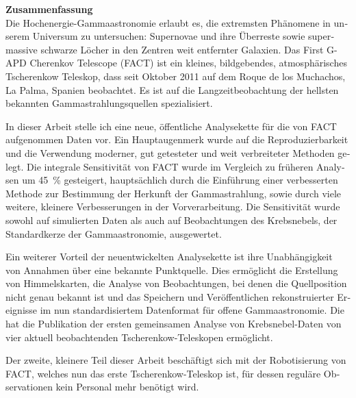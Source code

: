 \bigskip
\begin{otherlanguage}{ngerman}
\noindent\textbf{\sffamily\Large Zusammenfassung}\\[0.5\baselineskip]
Die Hochenergie-Gammaastronomie erlaubt es, die extremsten Phänomene in unserem Universum
zu untersuchen: Supernovae und ihre Überreste sowie supermassive schwarze Löcher in den
Zentren weit entfernter Galaxien.
  Das First G-APD Cherenkov Telescope (FACT) ist ein kleines, bildgebendes, atmosphärisches Tscherenkow Teleskop, dass seit Oktober 2011 auf dem Roque de los Muchachos, La Palma, Spanien beobachtet.
Es ist auf die Langzeitbeobachtung der hellsten bekannten Gammastrahlungsquellen spezialisiert.

In dieser Arbeit stelle ich eine neue, öffentliche Analysekette für die von FACT aufgenommen
Daten vor.
Ein Hauptaugenmerk wurde auf die Reproduzierbarkeit und die Verwendung moderner,
gut getesteter und weit verbreiteter Methoden gelegt.
Die integrale Sensitivität von FACT wurde im Vergleich zu früheren Analysen um \SI{45}{\percent}
gesteigert, hauptsächlich durch die Einführung einer verbesserten Methode zur Bestimmung der
Herkunft der Gammastrahlung, sowie durch viele weitere, kleinere Verbesserungen in der Vorverarbeitung.
Die Sensitivität wurde sowohl auf simulierten Daten als auch auf Beobachtungen des Krebsnebels,
der Standardkerze der Gammaastronomie, ausgewertet.

Ein weiterer Vorteil der neuentwickelten Analysekette ist ihre Unabhängigkeit von
Annahmen über eine bekannte Punktquelle.
Dies ermöglicht die Erstellung von Himmelskarten, die Analyse von Beobachtungen,
bei denen die Quellposition nicht genau bekannt ist und das Speichern und Veröffentlichen
rekonstruierter Ereignisse im nun standardisiertem Datenformat für offene Gammaastronomie.
Die hat die Publikation der ersten gemeinsamen Analyse von Krebsnebel-Daten von vier 
aktuell beobachtenden Tscherenkow-Teleskopen ermöglicht.

Der zweite, kleinere Teil dieser Arbeit beschäftigt sich mit der Robotisierung von FACT,
welches nun das erste Tscherenkow-Teleskop ist, für dessen reguläre Observationen kein Personal
mehr benötigt wird.


\end{otherlanguage}
